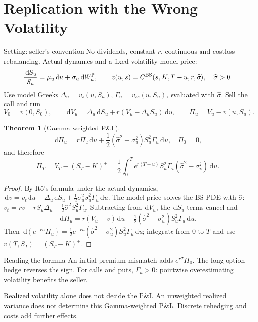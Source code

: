 \documentclass[10pt]{article}
\newcommand{\Pp}{\mathbb P}
\newcommand{\1}{\mathbf 1}
\newcommand{\dd}{\,\mathrm d}
\theoremstyle{definition}
\newtheorem{theorem}[definition]{Theorem}
\begin{document}
\section{Replication with the Wrong Volatility}

\begin{assumptionbox}{Setting: seller's convention}
No dividends, constant \(r\), continuous and costless rebalancing. Actual
dynamics and a fixed-volatility model price:
\[
\frac{\dd S_u}{S_u}=\mu_u\dd u+\sigma_u\dd W_u^{\Pp},\qquad
v(u,s)=C^{\rm BS}(s,K,T-u,r,\widehat\sigma),\quad \widehat\sigma>0.
\]
Use model Greeks \(\Delta_u=v_s(u,S_u)\), \(\Gamma_u=v_{ss}(u,S_u)\),
evaluated with \(\widehat\sigma\). Sell the call and run
\[
V_0=v(0,S_0),\qquad
\dd V_u=\Delta_u\dd S_u+r(V_u-\Delta_uS_u)\dd u,\qquad
\Pi_u=V_u-v(u,S_u).
\]
\end{assumptionbox}

\begin{theorem}[Gamma-weighted P\&L]
\[
\boxed{\dd\Pi_u=r\Pi_u\dd u+
\frac12(\widehat\sigma^2-\sigma_u^2)S_u^2\Gamma_u\dd u,\quad \Pi_0=0,}
\]
and therefore
\[
\boxed{\Pi_T=V_T-(S_T-K)^+
=\frac12\int_0^T e^{r(T-u)}S_u^2\Gamma_u
          (\widehat\sigma^2-\sigma_u^2)\dd u.}
\]
\end{theorem}
\begin{proof}
By It\^o's formula under the actual dynamics,
\(\dd v=v_t\dd u+\Delta_u\dd S_u+\tfrac12\sigma_u^2S_u^2\Gamma_u\dd u\).
The model price solves the BS PDE with \(\widehat\sigma\):
\(v_t=rv-rS_u\Delta_u-\tfrac12\widehat\sigma^2S_u^2\Gamma_u\). Subtracting
from \(\dd V_u\), the \(\dd S_u\) terms cancel and
\[
\dd\Pi_u=r(V_u-v)\dd u+\tfrac12(\widehat\sigma^2-\sigma_u^2)S_u^2\Gamma_u\dd u.
\]
Then \(\dd(e^{-ru}\Pi_u)=\tfrac12e^{-ru}(\widehat\sigma^2-\sigma_u^2)
S_u^2\Gamma_u\dd u\); integrate from \(0\) to \(T\) and use
\(v(T,S_T)=(S_T-K)^+\).
\end{proof}

\begin{keyidea}{Reading the formula}
An initial premium mismatch adds \(e^{rT}\Pi_0\). The long-option hedge
reverses the sign. For calls and puts, \(\Gamma_u>0\): pointwise
overestimating volatility benefits the seller.
\end{keyidea}

\begin{warningbox}{Realized volatility alone does not decide the P\&L}
An unweighted realized variance does not determine this Gamma-weighted P\&L.
Discrete rehedging and costs add further effects.
\end{warningbox}
\end{document}
